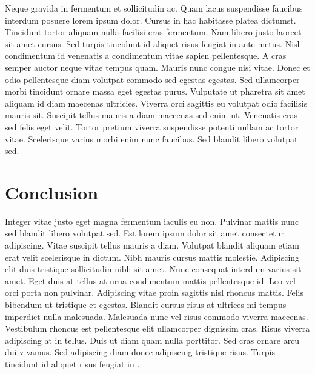Neque gravida in fermentum et sollicitudin ac. Quam lacus suspendisse
faucibus interdum posuere lorem ipsum dolor. Cursus in hac habitasse
platea dictumst. Tincidunt tortor aliquam nulla facilisi cras fermentum.
Nam libero justo laoreet sit amet cursus. Sed turpis tincidunt id
aliquet risus feugiat in ante metus. Nisl condimentum id venenatis a
condimentum vitae sapien pellentesque. A cras semper auctor neque vitae
tempus quam. Mauris nunc congue nisi vitae. Donec et odio pellentesque
diam volutpat commodo sed egestas egestas. Sed ullamcorper morbi
tincidunt ornare massa eget egestas purus. Vulputate ut pharetra sit
amet aliquam id diam maecenas ultricies. Viverra orci sagittis eu
volutpat odio facilisis mauris sit. Suscipit tellus mauris a diam
maecenas sed enim ut. Venenatis cras sed felis eget velit. Tortor
pretium viverra suspendisse potenti nullam ac tortor vitae. Scelerisque
varius morbi enim nunc faucibus. Sed blandit libero volutpat sed.

\hypertarget{conclusion}{%
\section{Conclusion}\label{conclusion}}

Integer vitae justo eget magna fermentum iaculis eu non. Pulvinar mattis
nunc sed blandit libero volutpat sed. Est lorem ipsum dolor sit amet
consectetur adipiscing. Vitae suscipit tellus mauris a diam. Volutpat
blandit aliquam etiam erat velit scelerisque in dictum. Nibh mauris
cursus mattis molestie. Adipiscing elit duis tristique sollicitudin nibh
sit amet. Nunc consequat interdum varius sit amet. Eget duis at tellus
at urna condimentum mattis pellentesque id. Leo vel orci porta non
pulvinar. Adipiscing vitae proin sagittis nisl rhoncus mattis. Felis
bibendum ut tristique et egestas. Blandit cursus risus at ultrices mi
tempus imperdiet nulla malesuada. Malesuada nunc vel risus commodo
viverra maecenas. Vestibulum rhoncus est pellentesque elit ullamcorper
dignissim cras. Risus viverra adipiscing at in tellus. Duis ut diam quam
nulla porttitor. Sed cras ornare arcu dui vivamus. Sed adipiscing diam
donec adipiscing tristique risus. Turpis tincidunt id aliquet risus
feugiat in .
